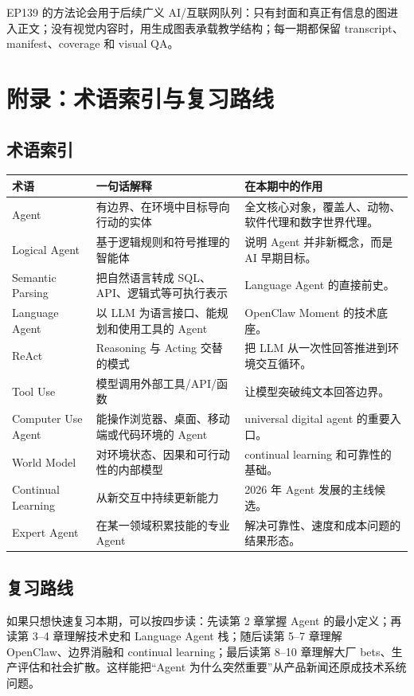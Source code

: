 \documentclass[a4paper]{article}
\begin{document}
EP139 的方法论会用于后续广义 AI/互联网队列：只有封面和真正有信息的图进入正文；没有视觉内容时，用生成图表承载教学结构；每一期都保留 transcript、manifest、coverage 和 visual QA。


\section{附录：术语索引与复习路线}

\subsection{术语索引}

\begin{longtable}{p{}p{}p{}}
\toprule
术语 & 一句话解释 & 在本期中的作用 \\
\midrule
Agent & 有边界、在环境中目标导向行动的实体 & 全文核心对象，覆盖人、动物、软件代理和数字世界代理。 \\
Logical Agent & 基于逻辑规则和符号推理的智能体 & 说明 Agent 并非新概念，而是 AI 早期目标。 \\
Semantic Parsing & 把自然语言转成 SQL、API、逻辑式等可执行表示 & Language Agent 的直接前史。 \\
Language Agent & 以 LLM 为语言接口、能规划和使用工具的 Agent & OpenClaw Moment 的技术底座。 \\
ReAct & Reasoning 与 Acting 交替的模式 & 把 LLM 从一次性回答推进到环境交互循环。 \\
Tool Use & 模型调用外部工具/API/函数 & 让模型突破纯文本回答边界。 \\
Computer Use Agent & 能操作浏览器、桌面、移动端或代码环境的 Agent & universal digital agent 的重要入口。 \\
World Model & 对环境状态、因果和可行动性的内部模型 & continual learning 和可靠性的基础。 \\
Continual Learning & 从新交互中持续更新能力 & 2026 年 Agent 发展的主线候选。 \\
Expert Agent & 在某一领域积累技能的专业 Agent & 解决可靠性、速度和成本问题的结果形态。 \\
\bottomrule
\end{longtable}

\subsection{复习路线}

如果只想快速复习本期，可以按四步读：先读第 2 章掌握 Agent 的最小定义；再读第 3--4 章理解技术史和 Language Agent 栈；随后读第 5--7 章理解 OpenClaw、边界消融和 continual learning；最后读第 8--10 章理解大厂 bets、生产评估和社会扩散。这样能把“Agent 为什么突然重要”从产品新闻还原成技术系统问题。
\end{document}
